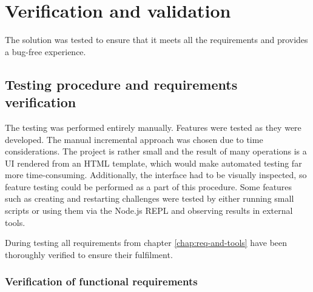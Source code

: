 \chapter{Verification and validation}

The solution was tested to ensure that it meets all the requirements and provides a bug-free experience.

\section{Testing procedure and requirements verification}
\label{sec:testing-and-verification}

The testing was performed entirely manually. Features were tested as they were developed. The manual incremental approach was chosen due to time considerations. The project is rather small and the result of many operations is a UI rendered from an HTML template, which would make automated testing far more time-consuming. Additionally, the interface had to be visually inspected, so feature testing could be performed as a part of this procedure. Some features such as creating and restarting challenges were tested by either running small scripts or using them via the Node.js REPL and observing results in external tools.

During testing all requirements from chapter \ref{chap:req-and-tools} have been thoroughly verified to ensure their fulfilment.

\subsection{Verification of functional requirements}

